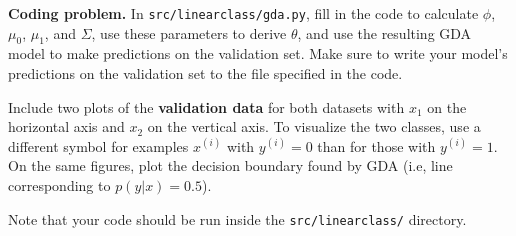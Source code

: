 \item {} \textbf{Coding problem.}
In \texttt{src/linearclass/gda.py}, fill in the code to
calculate $\phi$, $\mu_{0}$, $\mu_{1}$, and $\Sigma$, use these parameters
to derive $\theta$, and use the resulting GDA model to make predictions on the
validation set. Make sure to write your model's predictions on
the validation set to the file specified in the code.

Include two plots of the \textbf{validation data} for both datasets with $x_1$ on the horizontal axis and $x_2$ on the vertical axis.
To visualize the two classes, use a different symbol for examples $x^{(i)}$
with $y^{(i)} = 0$ than for those with $y^{(i)} = 1$. On the same figures, plot the decision boundary
found by GDA (i.e, line corresponding to $p(y|x) = 0.5$).

Note that your code should be run inside the \texttt{src/linearclass/} directory.

